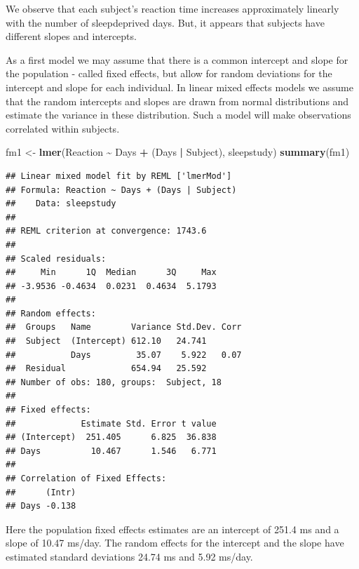 \documentclass[
  ignorenonframetext,
]{beamer}
\newenvironment{Shaded}{\begin{snugshade}}{\end{snugshade}}
\newcommand{\FunctionTok}[1]{\textcolor[rgb]{0.13,0.29,0.53}{\textbf{#1}}}
\newcommand{\NormalTok}[1]{#1}
\newcommand{\OtherTok}[1]{\textcolor[rgb]{0.56,0.35,0.01}{#1}}
\newcommand{\SpecialCharTok}[1]{\textcolor[rgb]{0.81,0.36,0.00}{\textbf{#1}}}
\begin{document}
\begin{frame}
We observe that each subject's reaction time increases approximately
linearly with the number of sleepdeprived days. But, it appears that
subjects have different slopes and intercepts.

As a first model we may assume that there is a common intercept and
slope for the population - called fixed effects, but allow for random
deviations for the intercept and slope for each individual. In linear
mixed effects models we assume that the random intercepts and slopes are
drawn from normal distributions and estimate the variance in these
distribution. Such a model will make observations correlated within
subjects.
\end{frame}

\begin{frame}[fragile]
\tiny

\begin{Shaded}
\begin{Highlighting}[]
\NormalTok{fm1 }\OtherTok{\textless{}{-}} \FunctionTok{lmer}\NormalTok{(Reaction }\SpecialCharTok{\textasciitilde{}}\NormalTok{ Days }\SpecialCharTok{+}\NormalTok{ (Days }\SpecialCharTok{|}\NormalTok{ Subject), sleepstudy)}
\FunctionTok{summary}\NormalTok{(fm1)}
\end{Highlighting}
\end{Shaded}

\begin{verbatim}
## Linear mixed model fit by REML ['lmerMod']
## Formula: Reaction ~ Days + (Days | Subject)
##    Data: sleepstudy
## 
## REML criterion at convergence: 1743.6
## 
## Scaled residuals: 
##     Min      1Q  Median      3Q     Max 
## -3.9536 -0.4634  0.0231  0.4634  5.1793 
## 
## Random effects:
##  Groups   Name        Variance Std.Dev. Corr
##  Subject  (Intercept) 612.10   24.741       
##           Days         35.07    5.922   0.07
##  Residual             654.94   25.592       
## Number of obs: 180, groups:  Subject, 18
## 
## Fixed effects:
##             Estimate Std. Error t value
## (Intercept)  251.405      6.825  36.838
## Days          10.467      1.546   6.771
## 
## Correlation of Fixed Effects:
##      (Intr)
## Days -0.138
\end{verbatim}

\normalsize

Here the population fixed effects estimates are an intercept of 251.4 ms
and a slope of 10.47 ms/day. The random effects for the intercept and
the slope have estimated standard deviations 24.74 ms and 5.92 ms/day.
\end{frame}
\end{document}
